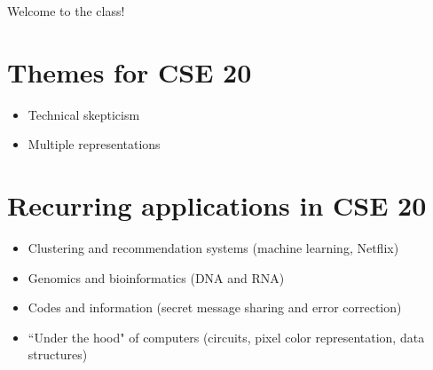 

Welcome to the class!

\section*{Themes for CSE 20}
\begin{itemize}
\item Technical skepticism
\item Multiple representations
\end{itemize}

\section*{Recurring applications in CSE 20}
\begin{itemize}
\item Clustering and recommendation systems (machine learning, Netflix)
\item Genomics and bioinformatics (DNA and RNA)
\item Codes and information (secret message sharing and error correction)
\item ``Under the hood" of computers (circuits, pixel color representation, data structures)
\end{itemize}



